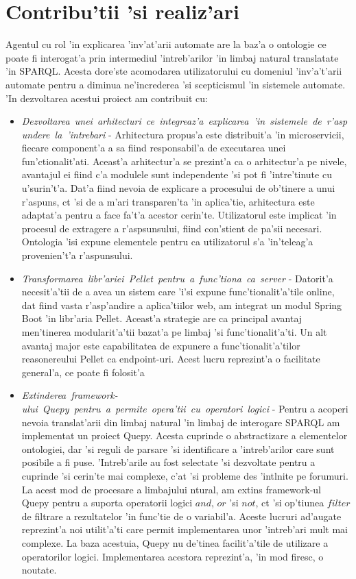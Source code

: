 \documentclass[12pt,a4paper,twoside]{report}
\begin{document}
\section{Contribu'tii 'si realiz'ari}
Agentul cu rol 'in explicarea 'inv'at'arii automate are la baz'a o ontologie ce poate fi interogat'a prin intermediul 'intreb'arilor 'in limbaj natural translatate 'in SPARQL. Acesta dore'ste acomodarea utilizatorului cu domeniul 'inv'a't'arii automate pentru a diminua ne'increderea 'si scepticismul 'in sistemele automate. 'In dezvoltarea acestui proiect am contribuit cu:

\begin{itemize}
    \item {\it Dezvoltarea\ unei\ arhitecturi\ ce\ integreaz'a\ explicarea\  'in\ sistemele\ de\ r'aspundere\ la\ 'intrebari} -  Arhitectura propus'a este distribuit'a 'in microservicii, fiecare component'a a sa fiind responsabil'a de executarea unei fun'ctionalit'ati. Aceast'a arhitectur'a se prezint'a ca o arhitectur'a pe nivele, avantajul ei fiind c'a modulele sunt independente 'si pot fi 'intre'tinute cu u'surin't'a. Dat'a fiind nevoia de explicare a procesului de ob'tinere a unui r'aspuns, c\ia t 'si de a m'ari transparen'ta 'in aplica'tie, arhitectura este adaptat'a pentru a face fa't'a acestor cerin'te. Utilizatorul este implicat 'in procesul de extragere a r'aspsunsului, fiind con'stient de pa'sii necesari. Ontologia 'isi expune elementele pentru ca utilizatorul s'a 'in'teleag'a provenien't'a r'aspunsului.

    
    \item {\it Transformarea\ libr'ariei\ Pellet\ pentru\ a\ func'tiona\ ca\ server} - Datorit'a necesit'a'tii de a avea un sistem care 'i'si expune func'tionalit'a'tile online, dat fiind vasta r'asp'andire a aplica'tiilor web, am integrat un modul Spring Boot 'in libr'aria Pellet. Aceast'a strategie are ca principal avantaj men'tinerea modularit'a'tii bazat'a pe limbaj 'si func'tionalit'a'ti. Un alt avantaj major este capabilitatea de expunere a func'tionalit'a'tilor reasonereului Pellet ca endpoint-uri. Acest lucru reprezint'a o facilitate general'a, ce poate fi folosit'a  
  
    \item {\it Extinderea\ framework-ului\ Quepy\ pentru\ a\ permite\ opera'tii\ cu\ operatori\ logici} - Pentru a acoperi nevoia translat'arii din limbaj natural 'in limbaj de interogare SPARQL am implementat un proiect Quepy. Acesta cuprinde o abstractizare a elementelor ontologiei, dar 'si reguli de parsare 'si identificare a 'intreb'arilor care sunt posibile a fi puse. 'Intreb'arile au fost selectate 'si dezvoltate pentru a cuprinde 'si cerin'te mai complexe, c'at 'si probleme des 'int\ia lnite pe forumuri. La acest mod de procesare a limbajului ntural, am extins framework-ul Quepy pentru a suporta operatorii logici $and$, $or$ 'si $not$, c\ia t 'si op'tiunea $filter$ de filtrare a rezultatelor 'in func'tie de o variabil'a. Aceste lucruri ad'augate reprezint'a noi utilit'a'ti care permit implementarea unor 'intreb'ari mult mai complexe. La baza acestuia, Quepy nu de'tinea facilit'a'tile de utilizare a operatorilor logici. Implementarea acestora reprezint'a, 'in mod firesc, o noutate.
    

\end{itemize}
\end{document}
